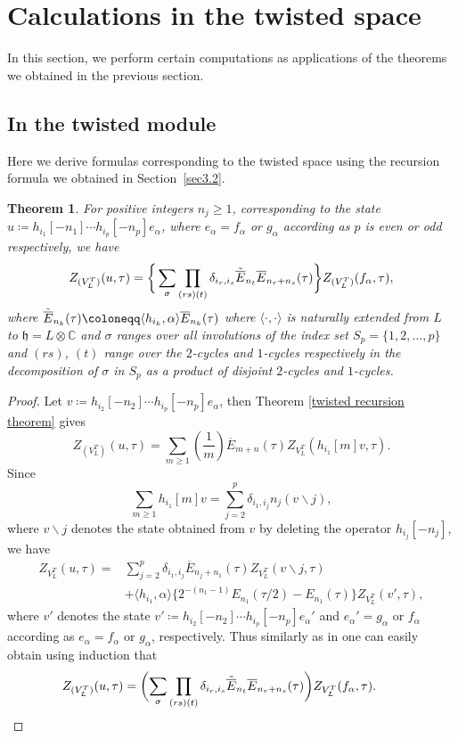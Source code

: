 \documentclass[pdftex]{sigma}
\numberwithin{equation}{section}
\newtheorem{Theorem}{Theorem}[section]
\theoremstyle{definition}
\begin{document}
\section{Calculations in the twisted space}\label{sec4}

In this section, we perform certain computations as applications of the theorems we obtained in the previous section.

\subsection{In the twisted module}

Here we derive formulas corresponding to the twisted space using the recursion formula we obtained in Section~\ref{sec3.2}.

\begin{Theorem}\label{Calculation in Twisted Module}
 For positive integers $n_j\geq 1$, corresponding to the state
$u\coloneqq h_{i_1}[-n_1]\cdots\allowbreak h_{i_p}[-n_p]e_{\alpha}$,
 where $e_{\alpha}=f_{\alpha}$ or $g_{\alpha}$ according as $p$ is even or odd respectively, we have
 \[Z_{(V_L^T)}(u,\tau)=\bigg\{\sum_{\sigma}\prod_{(rs)(t)}\delta_{i_r,i_s} \Tilde{\overline{E}}_{n_t}\overline{E}_{n_r+n_s}(\tau)\bigg\}Z_{(V_L^T)}(f_{\alpha},\tau),\]
 where
 $\Tilde{\overline{E}}_{n_k}(\tau)\coloneqq \langle h_{i_k},\alpha \rangle \overline{E}_{n_k}(\tau)$
 where $\langle \cdot,\cdot\rangle$ is naturally extended from $L$ to $\mathfrak{h}=L\otimes \mathbb{C}$ and $\sigma$ ranges over all involutions of the index set $S_p=\{1,2,\dots, p\}$ and $(rs)$, $(t)$ range over the $2$-cycles and $1$-cycles respectively in the decomposition of $\sigma$ in $S_p$ as a product of disjoint $2$-cycles and $1$-cycles.
\end{Theorem}

\begin{proof}
 Let
$v\coloneqq h_{i_2}[-n_2]\cdots h_{i_p}[-n_p]e_{\alpha}$,
 then Theorem \ref{twisted recursion theorem} gives
 \[Z_{(V_L^T)}(u,\tau)=\sum_{m\geq 1}\left(\frac{1}{m}\right) \overline{E}_{m+n}(\tau) Z_{V_L^T}( h_{i_1}[m]v, \tau).\]
Since
 \[\sum_{m\geq 1}h_{i_1}[m]v=\sum_{j=2}^p \delta_{i_1,i_j}n_j (v \backslash j),\]
where $v\backslash j$ denotes the state obtained from $v$ by deleting the operator $h_{i_j}[-n_j]$, we have
 \begin{align*}
 Z_{V_L^T}(u,\tau)={}&\sum_{j=2}^p\delta_{i_1,i_j}\overline{E}_{n_j+n_1}(\tau)Z_{V_L^T}( v\backslash j, \tau)\\
 &+\langle h_{i_1},\alpha\rangle \bigl\{2^{-(n_1-1)}{E}_{n_1}(\tau/2)-{E}_{n_1}(\tau)\bigr\} Z_{V_L^T}( v', \tau),\end{align*}
 where $v'$ denotes the state
$v'\coloneqq h_{i_2}[-n_2]\cdots h_{i_p}[-n_p]e_{\alpha}'$
 and $e_{\alpha}'=g_{\alpha}$ or $f_{\alpha}$ according as $e_{\alpha}=f_{\alpha}$ or $g_{\alpha}$, respectively.
Thus similarly as in \cite{Mason20231-PointAlgebras} one can easily obtain using induction that
\[
Z_{(V_L^T)}(u,\tau)=\biggl(\sum_{\sigma}\prod_{(rs)(t)}\delta_{i_r,i_s}
 \Tilde{\overline{E}}_{n_t}\overline{E}_{n_r+n_s}(\tau)\biggr)Z_{V_L^T}(f_{\alpha},\tau).\tag*{\qed}
\]\renewcommand{\qed}{}
\end{proof}
\end{document}
